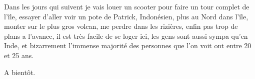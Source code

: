 \begin{multicols}{2}

Dans les jours qui suivent je vais louer un scooter pour faire un tour complet de l'île, essayer d'aller voir un pote de Patrick, Indonésien, plus au Nord dans l'île, monter sur le plus gros volcan, me perdre dans les rizières, enfin pas trop de plans a l'avance, il est très facile de se loger ici, les gens sont aussi sympa qu'en Inde, et bizarrement l'immense majorité des personnes que l'on voit ont entre 20 et 25 ans.

A bientôt.

\end{multicols}


